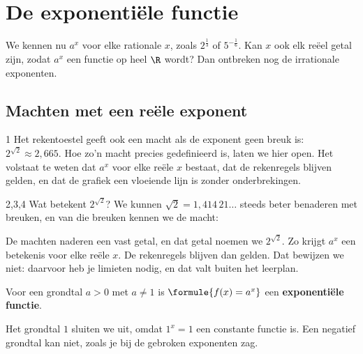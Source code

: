 \section{De exponentiële functie}

We kennen nu $a^x$ voor elke rationale $x$, zoals $2^{\frac13}$ of $5^{-\frac16}$. Kan $x$ ook elk reëel getal zijn, zodat $a^x$ een functie op heel $\R$ wordt? Dan ontbreken nog de irrationale exponenten.

\subsection{Machten met een reële exponent}

\begin{alleenvoor}{1}
Het rekentoestel geeft ook een macht als de exponent geen breuk is: $2^{\sqrt2} \approx 2{,}665$. Hoe zo'n macht precies gedefinieerd is, laten we hier open. Het volstaat te weten dat $a^x$ voor elke reële $x$ bestaat, dat de rekenregels blijven gelden, en dat de grafiek een vloeiende lijn is zonder onderbrekingen.
\end{alleenvoor}
\begin{alleenvoor}{2,3,4}
Wat betekent $2^{\sqrt2}$? We kunnen $\sqrt2 = 1{,}414\,21\ldots$ steeds beter benaderen met breuken, en van die breuken kennen we de macht:


De machten naderen een vast getal, en dat getal noemen we $2^{\sqrt2}$. Zo krijgt $a^x$ een betekenis voor elke reële $x$. De rekenregels blijven dan gelden. Dat bewijzen we niet: daarvoor heb je limieten nodig, en dat valt buiten het leerplan.
\end{alleenvoor}

\begin{theorie}
Voor een grondtal $a > 0$ met $a \neq 1$ is $\formule{f(x) = a^x}$ een \textbf{\textcolor{accent}{exponentiële functie}}.
\end{theorie}

Het grondtal $1$ sluiten we uit, omdat $1^x = 1$ een constante functie is. Een negatief grondtal kan niet, zoals je bij de gebroken exponenten zag.

